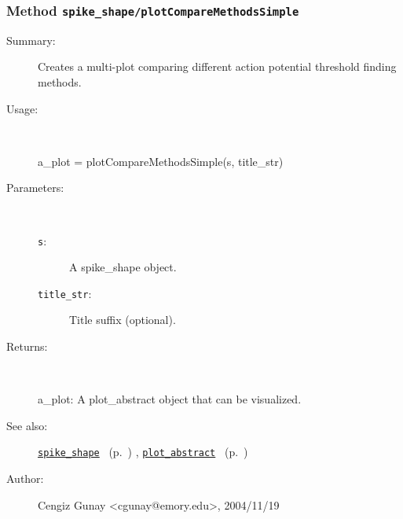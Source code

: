 \subsubsection[Method \texttt{plotCompareMethodsSimple}]{Method \texttt{spike\_shape/plotCompareMethodsSimple}}%
%
\label{ref_spike_shape__plotCompareMethodsSimple}%
\hypertarget{ref_spike_shape__plotCompareMethodsSimple}{}%
\begin{description}
\item[Summary:]Creates a multi-plot comparing different action potential
			threshold finding methods.
%
\item[Usage:]~%
\begin{lyxcode}%
a\_plot = plotCompareMethodsSimple(s, title\_str)
%
\end{lyxcode}%
%
%
\item[Parameters:]~
\begin{description}%
\item[\texttt{s}:]
 A spike\_shape object.
\item[\texttt{title\_str}:]
 Title suffix (optional).
\end{description}%
%
\item[Returns:
]~

	a\_plot: A plot\_abstract object that can be visualized.
%
%
\item[See also:]%
\hyperlink{ref_spike_shape}{\texttt{spike\_shape}}%
\ (p.~\pageref{ref_spike_shape})%
%
, \hyperlink{ref_plot_abstract}{\texttt{plot\_abstract}}%
\ (p.~\pageref{ref_plot_abstract})%
%
%
\item[Author:]%
Cengiz Gunay <cgunay@emory.edu>, 2004/11/19
%
\end{description}
\methodline%
